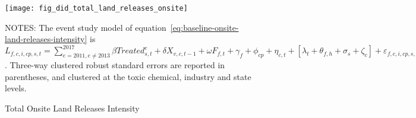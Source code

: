 \begin{figure}[H]
    \centering
    \texttt{[image: fig\_did\_total\_land\_releases\_onsite]}
    \caption{Total Onsite Land Releases Intensity}
    \label{fig:baseline-onsite-land-releases-intensity}
    \begin{minipage}{12cm}
        \vspace{0.05in}
        NOTES: The event study model of equation~\ref{eq:baseline-onsite-land-releases-intensity} is $L_{f,c,i,cp,s,t} = \sum_{{e = 2011},{e \neq 2013}}^{2017} \beta Treated_{s,t}^e + \delta X_{v,c,t-1} + \omega F_{f,t} + \gamma_{f} + \phi_{cp} + \eta_{c,t} + \left[\lambda_{t} + \theta_{f,h} + \sigma_{s} + \zeta_{c} \right] + \varepsilon_{f,c,i,cp,s,t}$. Three-way clustered robust standard errors are reported in parentheses, and clustered at the toxic chemical, industry and state levels.
    \end{minipage}
\end{figure}